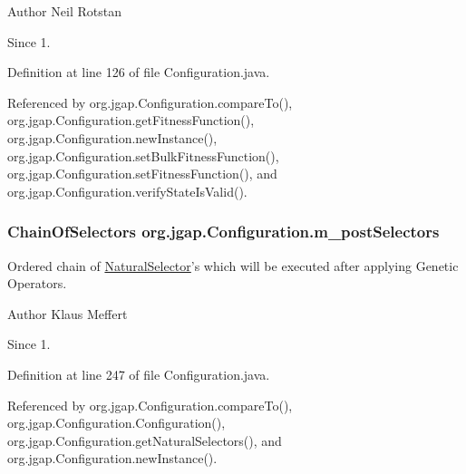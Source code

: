 \begin{DoxyAuthor}{Author}
Neil Rotstan 
\end{DoxyAuthor}
\begin{DoxySince}{Since}
1. 
\end{DoxySince}


Definition at line 126 of file Configuration.\-java.



Referenced by org.\-jgap.\-Configuration.\-compare\-To(), org.\-jgap.\-Configuration.\-get\-Fitness\-Function(), org.\-jgap.\-Configuration.\-new\-Instance(), org.\-jgap.\-Configuration.\-set\-Bulk\-Fitness\-Function(), org.\-jgap.\-Configuration.\-set\-Fitness\-Function(), and org.\-jgap.\-Configuration.\-verify\-State\-Is\-Valid().

\hypertarget{classorg_1_1jgap_1_1_configuration_a9328a49ae6f8f5aede05d31433b563eb}{
\subsubsection[{m\-\_\-post\-Selectors}]{\setlength{\rightskip}{0pt plus 5cm}Chain\-Of\-Selectors org.\-jgap.\-Configuration.\-m\-\_\-post\-Selectors\hspace{0.3cm}{\ttfamily [private]}}}\label{classorg_1_1jgap_1_1_configuration_a9328a49ae6f8f5aede05d31433b563eb}
Ordered chain of \hyperlink{classorg_1_1jgap_1_1_natural_selector}{Natural\-Selector}'s which will be executed after applying Genetic Operators.

\begin{DoxyAuthor}{Author}
Klaus Meffert 
\end{DoxyAuthor}
\begin{DoxySince}{Since}
1. 
\end{DoxySince}


Definition at line 247 of file Configuration.\-java.



Referenced by org.\-jgap.\-Configuration.\-compare\-To(), org.\-jgap.\-Configuration.\-Configuration(), org.\-jgap.\-Configuration.\-get\-Natural\-Selectors(), and org.\-jgap.\-Configuration.\-new\-Instance().

